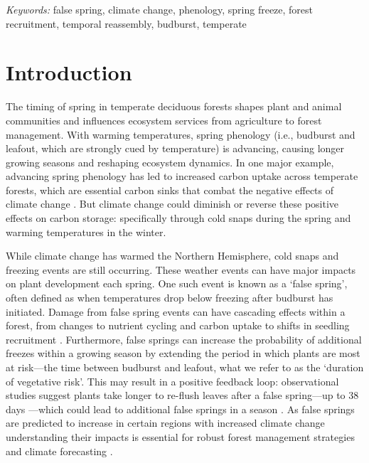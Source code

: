 \documentclass{article}\usepackage[]{graphicx}\usepackage[]{color}
\begin{document}
\begin{enumerate}
\vspace{2ex}
\textit{Keywords:} false spring, climate change, phenology, spring freeze, forest recruitment, temporal reassembly, budburst, temperate

\section*{Introduction}
The timing of spring in temperate deciduous forests shapes plant and animal communities and influences ecosystem services from agriculture to forest management. With warming temperatures, spring phenology (i.e., budburst and leafout, which are strongly cued by temperature) is advancing, causing longer growing seasons \citep{Chuine2001} and reshaping ecosystem dynamics. In one major example, advancing spring phenology has led to increased carbon uptake across temperate forests, which are essential carbon sinks that combat the negative effects of climate change \citep{Keenan2014}. But climate change could diminish or reverse these positive effects on carbon storage: specifically through cold snaps during the spring and warming temperatures in the winter.
  
While climate change has warmed the Northern Hemisphere, cold snaps and freezing events are still occurring. These weather events can have major impacts on plant development each spring. One such event is known as a `false spring', often defined as when temperatures drop below freezing \citep[][i.e., below -2.2$^{\circ}$C]{Schwartz2002} after budburst has initiated. Damage from false spring events can have cascading effects within a forest, from changes to nutrient cycling and carbon uptake to shifts in seedling recruitment \citep{Hufkens2012, Klosterman2018, Richardson2013}. Furthermore, false springs can increase the probability of additional freezes within a growing season by extending the period in which plants are most at risk---the time between budburst and leafout, what we refer to as the `duration of vegetative risk'. This may result in a positive feedback loop: observational studies suggest plants take longer to re-flush leaves after a false spring---up to 38 days \citep{Augspurger2009, Augspurger2013, Gu2008, Menzel2015}---which could lead to additional false springs in a season \citep{Augspurger2009}. As false springs are predicted to increase in certain regions with increased climate change \citep{Ault2015, Liu2018, Zohner2020} understanding their impacts is essential for robust forest management strategies and climate forecasting \citep{OBrien2019}. 
  

\end{enumerate}
\end{document}
